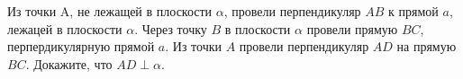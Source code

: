 Из точки A, не лежащей в плоскости $\alpha$, провели перпендикуляр $AB$ к прямой $a$, лежацей в плоскости $\alpha$. Через точку $B$ в плоскости $\alpha$ провели прямую $BC$, перпердикулярную прямой $a$. Из точки $A$ провели перпендикуляр $AD$ на прямую $BC$. Докажите, что $AD\perp \alpha$.
